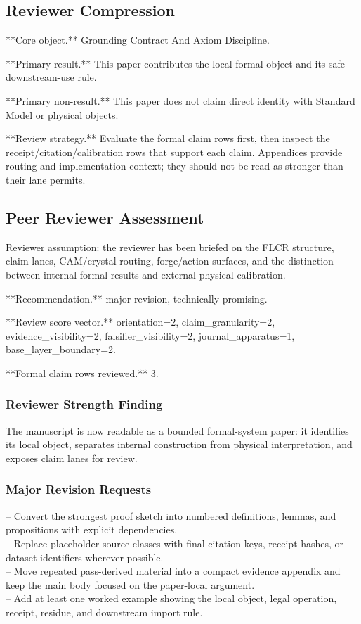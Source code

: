 \documentclass[11pt]{article}
\begin{document}
\subsection*{Reviewer Compression}

**Core object.** Grounding Contract And Axiom Discipline.

**Primary result.** This paper contributes the local formal object and its safe downstream-use rule.

**Primary non-result.** This paper does not claim direct identity with Standard Model or physical objects.

**Review strategy.** Evaluate the formal claim rows first, then inspect the receipt/citation/calibration rows that support each claim. Appendices provide routing and implementation context; they should not be read as stronger than their lane permits.

\subsection*{Peer Reviewer Assessment}

Reviewer assumption: the reviewer has been briefed on the FLCR structure, claim lanes, CAM/crystal routing, forge/action surfaces, and the distinction between internal formal results and external physical calibration.

**Recommendation.** major revision, technically promising.

**Review score vector.** orientation=2, claim\_granularity=2, evidence\_visibility=2, falsifier\_visibility=2, journal\_apparatus=1, base\_layer\_boundary=2.

**Formal claim rows reviewed.** 3.

\subsubsection*{Reviewer Strength Finding}

The manuscript is now readable as a bounded formal-system paper: it identifies its local object, separates internal construction from physical interpretation, and exposes claim lanes for review.

\subsubsection*{Major Revision Requests}

\noindent{}-- Convert the strongest proof sketch into numbered definitions, lemmas, and propositions with explicit dependencies.\\
\noindent{}-- Replace placeholder source classes with final citation keys, receipt hashes, or dataset identifiers wherever possible.\\
\noindent{}-- Move repeated pass-derived material into a compact evidence appendix and keep the main body focused on the paper-local argument.\\
\noindent{}-- Add at least one worked example showing the local object, legal operation, receipt, residue, and downstream import rule.\\
\end{document}

